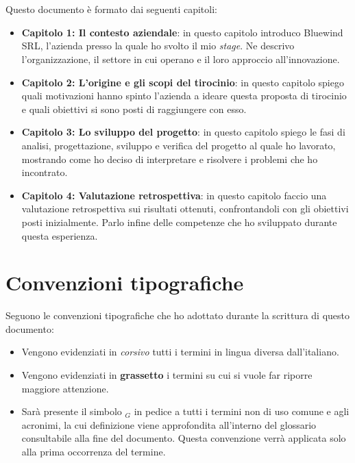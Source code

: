 \\\\
\noindent
Questo documento è formato dai seguenti capitoli:
\begin{itemize}
    \itemsep0em
    \item \textbf{Capitolo 1: Il contesto aziendale}: in questo capitolo introduco Bluewind SRL, l'azienda presso la quale ho svolto il mio \textit{stage}. Ne descrivo l'organizzazione, il settore in cui operano e il loro approccio all'innovazione.
    \item \textbf{Capitolo 2: L'origine e gli scopi del tirocinio}: in questo capitolo spiego quali motivazioni hanno spinto l'azienda a ideare questa proposta di tirocinio e quali obiettivi si sono posti di raggiungere con esso.
    \item \textbf{Capitolo 3: Lo sviluppo del progetto}: in questo capitolo spiego le fasi di analisi, progettazione, sviluppo e verifica del progetto al quale ho lavorato, mostrando come ho deciso di interpretare e risolvere i problemi che ho incontrato.
    \item \textbf{Capitolo 4: Valutazione retrospettiva}: in questo capitolo faccio una valutazione retrospettiva sui risultati ottenuti, confrontandoli con gli obiettivi posti inizialmente. Parlo infine delle competenze che ho sviluppato durante questa esperienza.
\end{itemize}
\newpage
\chapter*{Convenzioni tipografiche}
\noindent
Seguono le convenzioni tipografiche che ho adottato durante la scrittura di questo documento:
\begin{itemize}
    \itemsep0em
    \item Vengono evidenziati in \textit{corsivo} tutti i termini in lingua diversa dall'italiano.
    \item Vengono evidenziati in \textbf{grassetto} i termini su cui si vuole far riporre maggiore attenzione.
    \item Sarà presente il simbolo $_{G}$ in pedice a tutti i termini non di uso comune e agli acronimi, la cui definizione viene approfondita all'interno del glossario consultabile alla fine del documento.
    Questa convenzione verrà applicata solo alla prima occorrenza del termine.
\end{itemize}

\endgroup
\vfill
